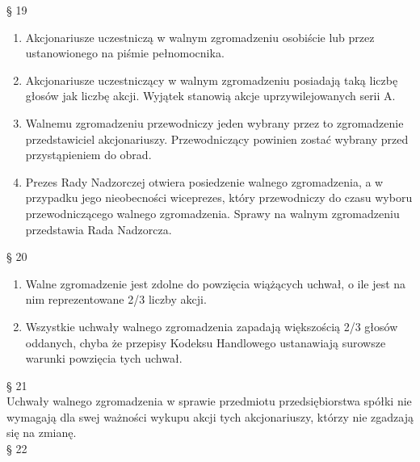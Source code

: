 \documentclass[a4paper, 11pt]{article}
\begin{document}
§ 19\\
\begin{enumerate}
\item	Akcjonariusze uczestniczą w walnym zgromadzeniu osobiście lub przez ustanowionego na piśmie pełnomocnika.
\item	Akcjonariusze uczestniczący w walnym zgromadzeniu posiadają taką liczbę głosów jak liczbę akcji. Wyjątek stanowią akcje uprzywilejowanych serii A. 
\item	Walnemu zgromadzeniu przewodniczy jeden wybrany przez to zgromadzenie przedstawiciel akcjonariuszy. Przewodniczący powinien zostać wybrany przed przystąpieniem do obrad.
\item	Prezes Rady Nadzorczej otwiera posiedzenie walnego zgromadzenia, a w przypadku jego nieobecności wiceprezes, który przewodniczy do czasu wyboru przewodniczącego walnego zgromadzenia. Sprawy na walnym zgromadzeniu przedstawia Rada Nadzorcza.

\end{enumerate}

§ 20\\
\begin{enumerate}
\item	Walne zgromadzenie jest zdolne do powzięcia wiążących uchwał, o ile jest na nim reprezentowane 2/3 liczby akcji.
\item	Wszystkie uchwały walnego zgromadzenia zapadają większością 2/3 głosów oddanych, chyba że przepisy Kodeksu Handlowego ustanawiają surowsze warunki powzięcia tych uchwał.
\end{enumerate}


§ 21\\

Uchwały walnego zgromadzenia w sprawie przedmiotu przedsiębiorstwa spółki nie wymagają dla swej ważności wykupu akcji tych akcjonariuszy, którzy nie zgadzają się na zmianę.\\ 

§ 22\\
\end{document}
